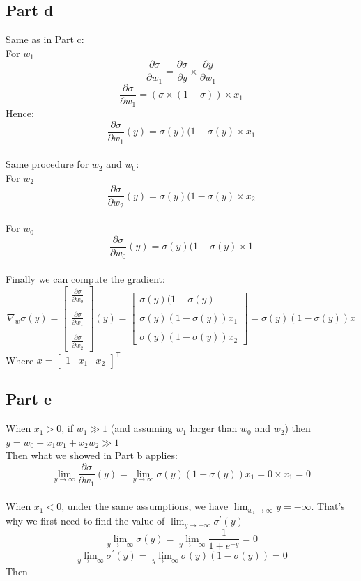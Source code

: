 \documentclass[a4paper, 10pt]{article}
\begin{document}
\subsection{Part d}
Same as in Part c:
\\
For $w_1$
$$
\frac{\partial\sigma}{\partial w_1} = \frac{\partial\sigma}{\partial y} \times \frac{\partial y}{\partial w_1}
$$
$$
\frac{\partial\sigma}{\partial w_1} = \left(\sigma \times (1 - \sigma)\right) \times x_1
$$
Hence:
$$
\frac{\partial\sigma}{\partial w_1}(y) = \sigma(y) (1-\sigma(y) \times x_1
$$
\\
Same procedure for $w_2$ and $w_0$:\\
For $w_2$
$$
\frac{\partial\sigma}{\partial w_2}(y) = \sigma(y) (1-\sigma(y) \times x_2
$$
\\
For $w_0$
$$
\frac{\partial\sigma}{\partial w_0}(y) = \sigma(y) (1-\sigma(y) \times 1
$$
\\
Finally we can compute the gradient:
$$
\nabla_w\sigma(y) = \begin{bmatrix}
                        \frac{\partial\sigma}{\partial w_0}\\\\
                        \frac{\partial\sigma}{\partial w_1}\\\\
                        \frac{\partial\sigma}{\partial w_2}
                    \end{bmatrix}(y) = 
                    \begin{bmatrix}
                        \sigma(y) (1-\sigma(y)\\\\
                        \sigma(y) (1-\sigma(y)) x_1\\\\
                        \sigma(y) (1-\sigma(y)) x_2
                    \end{bmatrix} =
                    \sigma(y)(1-\sigma(y))x
$$
Where $x =  \begin{bmatrix}
            1 & x_1 & x_2
            \end{bmatrix}^\mathsf{T}$

\subsection{Part e}
When $x_1 > 0$, if $w_1 \gg 1$ (and assuming $w_1$ larger than $w_0$ and $w_2$) then $y = w_0 + x_1w_1 + x_2w_2 \gg 1$
\\
Then what we showed in Part b applies:
$$
\lim_{y\to\infty} \frac{\partial\sigma}{\partial w_1}(y) = \lim_{y\to\infty} \sigma(y) (1-\sigma(y)) x_1 = 0 \times x_1 = 0
$$
\\
When $x_1 < 0$, under the same assumptions, we have $\lim_{w_1\to\infty}y = -\infty$. That's why we first need to find the value of $\lim_{y\to -\infty}\sigma^\prime(y)$
$$
\lim_{y\to -\infty}\sigma(y) = \lim_{y\to -\infty} \frac{1}{1+e^{-y}} = 0
$$
$$
\lim_{y\to -\infty}\sigma^\prime(y) = \lim_{y\to -\infty} \sigma(y)(1-\sigma(y))=0
$$
Then
\end{document}
